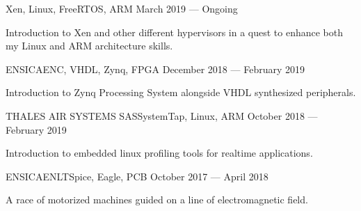 \documentclass{faresume}
\begin{document}
\begin{column}[\leftcolumnwidth]
            {}{Xen, Linux, FreeRTOS, ARM}
            {March 2019 --- Ongoing}
            {
                \begin{additems}
                    \item Introduction to Xen and other different hypervisors in a quest to enhance both my Linux and ARM architecture skills.
                \end{additems}
            }

            {ENSICAEN}{C, VHDL, Zynq, FPGA}
            {December 2018 --- February 2019}
            {
                \begin{additems}
                    \item Introduction to Zynq Processing System alongside VHDL synthesized peripherals.
                \end{additems}
            }

            {THALES AIR SYSTEMS SAS}{SystemTap, Linux, ARM}
            {October 2018 --- February 2019}
            {
                \begin{additems}
                    \item Introduction to embedded linux profiling tools for realtime applications.
                \end{additems}
            }

            {ENSICAEN}{LTSpice, Eagle, PCB}
            {October 2017 --- April 2018}
            {
                \begin{additems}
                    \item A race of motorized machines guided on a line of electromagnetic field.
                \end{additems}
            }

\end{column}
\end{document}
